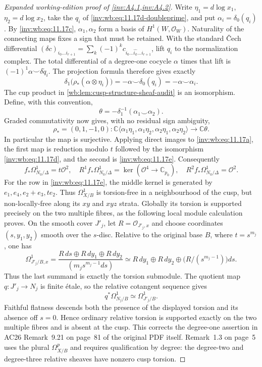 \begin{proof}[Expanded working-edition proof of \cref{inv:A4.1,inv:A4.2}]
Write $\eta_1=d\log x_1$, $\eta_2=d\log x_2$, take the $q_i$ of
\eqref{inv:wb:eq:11.17d-doubleprime}, and put $\alpha_i=\delta_0(q_i)$.  By \eqref{inv:wb:eq:11.17c},
$\alpha_1,\alpha_2$ form a basis of $H^1(W,\mathcal O_W)$.  Naturality of
the connecting maps fixes a sign that must be retained.  With the standard
\v Cech differential
$(\delta c)_{i_0\ldots i_{r+1}}
=\sum_k(-1)^kc_{i_0\ldots\widehat{i_k}\ldots i_{r+1}}$, lift $q_i$ to the
normalization complex.  The total differential of a degree-one cocycle
$\alpha$ times that lift is
$(-1)^1\alpha\smile\delta\widetilde q_i$.  The projection formula therefore
gives exactly
\[
 \delta_1\bigl(\rho_*(\alpha\otimes\eta_i)\bigr)
 =-\alpha\smile\delta_0(q_i)=-\alpha\smile\alpha_i.
\]
The cup product in \cref{wb:lem:cusp-structure-sheaf-audit} is an isomorphism.
Define, with this convention,
\[
 \theta=-\delta_1^{-1}(\alpha_1\smile\alpha_2).
\]
Graded commutativity now gives, with no residual sign ambiguity,
\[
 \rho_*=(0,1,-1,0):
 \mathbb C\langle
 \alpha_1\eta_1,\alpha_1\eta_2,\alpha_2\eta_1,\alpha_2\eta_2
 \rangle\longrightarrow\mathbb C\theta.
\tag{WBH.11.17e}\label{inv:wb:eq:11.17e}
\]
In particular the map is surjective.  Applying direct images to \eqref{inv:wb:eq:11.17a},
the first map is reduction modulo $t$ followed by the isomorphism \eqref{inv:wb:eq:11.17d},
and the second is \eqref{inv:wb:eq:11.17e}.  Consequently
\[
 f_*\Omega^1_{N_0/\Delta}=t\mathcal O^2,\quad
 R^1f_*\Omega^1_{N_0/\Delta}=\ker(\mathcal O^4\to\mathbb C_{p_0}),
 \quad R^2f_*\Omega^1_{N_0/\Delta}=\mathcal O^2.
\]
For the row in \eqref{inv:wb:eq:11.17e}, the middle kernel is generated by
$e_1,e_4,e_2+e_3,te_2$.
Thus $\Omega^1_{X/B}$ is torsion-free in a neighbourhood of the cusp, but
non-locally-free along its $xy$ and $xyz$ strata.  Globally its torsion is
supported precisely on the two multiple fibres, as the following local module
calculation proves.  On the smooth cover $J'_j$, let
$R=\mathcal O_{J'_j,x}$ and choose coordinates $(s,y_1,y_2)$ smooth over the
$s$-disc.  Relative to the original base $B$, where $t=s^{m_j}$, one has
\[
 \Omega^1_{J'_j/B,x}
 =\frac{R\,ds\oplus R\,dy_1\oplus R\,dy_2}
        {(m_js^{m_j-1}ds)}
 \simeq R\,dy_1\oplus R\,dy_2
 \oplus\bigl(R/(s^{m_j-1})\bigr)ds.
\tag{WBH.11.17f}\label{inv:wb:eq:11.17f}
\]
Thus the last summand is exactly the torsion submodule.  The quotient map
$q:J'_j\to N_j$ is finite \'{e}tale, so the relative cotangent sequence gives
\[
 q^*\Omega^1_{N_j/B}\simeq\Omega^1_{J'_j/B}.
\]
Faithful flatness descends both the presence of the displayed torsion and its
absence off $s=0$.  Hence ordinary relative torsion is supported exactly on
the two multiple fibres and is absent at the cusp.  This corrects the
degree-one assertion in AC26 Remark~9.21 on page~81 of the original
PDF itself.  Remark~1.3 on page~5 uses the plural $\Omega^p_{X/B}$
and requires qualification by degree: the degree-two and degree-three
relative sheaves have nonzero cusp torsion.

\end{proof}


